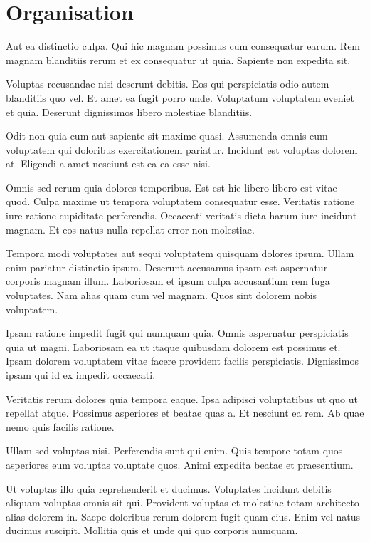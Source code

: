\documentclass[a4paper]{article}
\begin{document}
\clearpage
{}
\nocite{coursera}
\nocite{caltech}
\nocite{python}
\nocite{pydoc}
\nocite{ml-intro}
\nocite{gb-tuto}
\nocite{nn-tuto}



\clearpage
\section*{Organisation}

\begin{multicols}{2}

Aut ea distinctio culpa. Qui hic magnam possimus cum consequatur earum. Rem
    magnam blanditiis rerum et ex consequatur ut quia. Sapiente non expedita
    sit.

Voluptas recusandae nisi deserunt debitis. Eos qui perspiciatis odio autem
    blanditiis quo vel. Et amet ea fugit porro unde. Voluptatum voluptatem
    eveniet et quia. Deserunt dignissimos libero molestiae blanditiis.

Odit non quia eum aut sapiente sit maxime quasi. Assumenda omnis eum voluptatem
    qui doloribus exercitationem pariatur. Incidunt est voluptas dolorem at.
    Eligendi a amet nesciunt est ea ea esse nisi.

Omnis sed rerum quia dolores temporibus. Est est hic libero libero est vitae
    quod. Culpa maxime ut tempora voluptatem consequatur esse. Veritatis ratione
    iure ratione cupiditate perferendis. Occaecati veritatis dicta harum iure
    incidunt magnam. Et eos natus nulla repellat error non molestiae.

Tempora modi voluptates aut sequi voluptatem quisquam dolores ipsum. Ullam enim
    pariatur distinctio ipsum. Deserunt accusamus ipsam est aspernatur corporis
    magnam illum. Laboriosam et ipsum culpa accusantium rem fuga voluptates. Nam
    alias quam cum vel magnam. Quos sint dolorem nobis voluptatem.

Ipsam ratione impedit fugit qui numquam quia. Omnis aspernatur perspiciatis quia
    ut magni. Laboriosam ea ut itaque quibusdam dolorem est possimus et. Ipsam
    dolorem voluptatem vitae facere provident facilis perspiciatis. Dignissimos
    ipsam qui id ex impedit occaecati.

Veritatis rerum dolores quia tempora eaque. Ipsa adipisci voluptatibus ut quo ut
    repellat atque. Possimus asperiores et beatae quas a. Et nesciunt ea rem. Ab
    quae nemo quis facilis ratione.

Ullam sed voluptas nisi. Perferendis sunt qui enim. Quis tempore totam quos
    asperiores eum voluptas voluptate quos. Animi expedita beatae et
    praesentium.

Ut voluptas illo quia reprehenderit et ducimus. Voluptates incidunt debitis
    aliquam voluptas omnis sit qui. Provident voluptas et molestiae totam
    architecto alias dolorem in. Saepe doloribus rerum dolorem fugit quam eius.
    Enim vel natus ducimus suscipit. Mollitia quis et unde qui quo corporis
    numquam.

\end{multicols}
\end{document}
